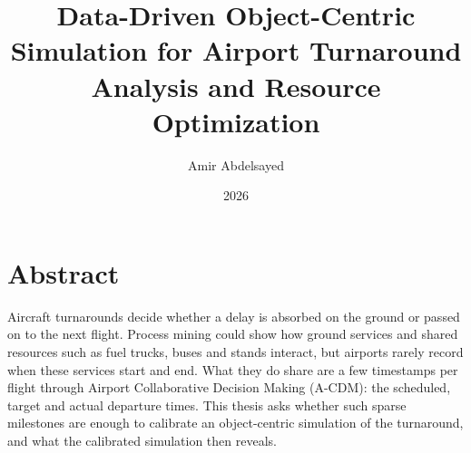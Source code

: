 \documentclass[
]{elteikthesis}[2024/04/26]
\title{Data-Driven Object-Centric Simulation for Airport Turnaround Analysis and Resource Optimization} %
\date{2026} %
\author{Amir Abdelsayed}
\affiliation{Head of Department} %
\begin{document}
\maketitle
\chapter*{Abstract}
Aircraft turnarounds decide whether a delay is absorbed on the ground or passed on to the next flight. Process mining could show how ground services and shared resources such as fuel trucks, buses and stands interact, but airports rarely record when these services start and end. What they do share are a few timestamps per flight through Airport Collaborative Decision Making (A-CDM): the scheduled, target and actual departure times. This thesis asks whether such sparse milestones are enough to calibrate an object-centric simulation of the turnaround, and what the calibrated simulation then reveals.
\end{document}
